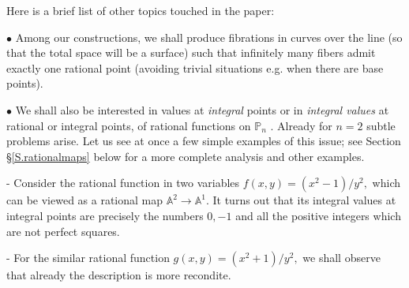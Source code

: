 \documentclass[leqno,12pt]{article} %
\def\A{{{\mathbb A}}}
\def\Z{{{\mathbb Z}}}
\def\P{{{\mathbb P}}}
\theoremstyle{plain} %
\theoremstyle{definition} %
\begin{document}
 

 \medskip
 
 
 
Here is a brief list of other topics touched in the paper:
 
 \smallskip

$\bullet$ Among our constructions, we shall produce fibrations in curves over the line (so that the total space will be a surface) such that infinitely many fibers admit exactly one rational point (avoiding trivial situations e.g. when there are base points). 

\smallskip


$\bullet$ We shall also be interested in values at {\it integral} points or in {\it integral values} at rational or integral points, of rational functions on $\P_n$ . 
Already for $n=2$ subtle problems arise. Let us see at once  a few  simple examples of this issue; see Section  \S \ref{S.rationalmaps} below for a more complete analysis and other examples.

- Consider the rational function in two variables 
$
f(x,y)=(x^2-1)/y^2,
$
 which can be viewed as a rational map $\A^2\to\A^1$. It turns  out that its integral values at integral points %
 are precisely the numbers $0,-1$ and all the positive integers which are not perfect squares.  

- For  the  similar rational function 
$
g(x,y)=(x^2+1)/y^2,
$ 
we shall observe that already the description is more recondite. %
\end{document}
